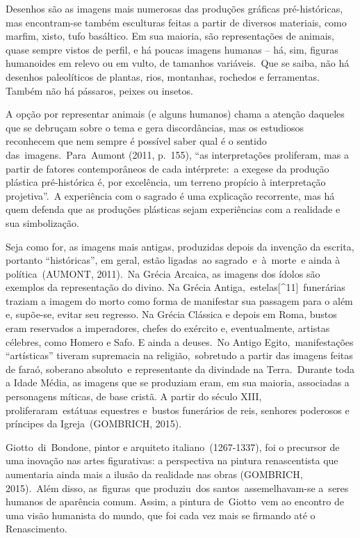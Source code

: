 \documentclass[
  letterpaper,
  a4paper,
  12pt]{scrbook}
\begin{document}
Desenhos são as imagens mais numerosas das produções gráficas
pré-históricas, mas encontram-se também esculturas feitas a partir de
diversos materiais, como marfim, xisto, tufo basáltico. Em sua maioria,
são representações de animais, quase sempre vistos de perfil, e há
poucas imagens humanas -- há, sim, figuras humanoides em relevo ou em
vulto, de tamanhos variáveis.~Que se saiba, não há desenhos paleolíticos
de plantas, rios, montanhas, rochedos e ferramentas. Também não há
pássaros, peixes ou insetos.~

A opção por representar animais (e alguns humanos) chama a atenção
daqueles que se debruçam sobre o tema e gera discordâncias, mas os
estudiosos reconhecem que nem sempre é possível saber qual é o sentido
das~imagens.~Para~Aumont (2011, p.~155), ``as interpretações proliferam,
mas a partir de fatores contemporâneos de cada intérprete:~a exegese da
produção plástica pré-histórica é, por excelência, um terreno propício à
interpretação projetiva''.~A experiência com o sagrado é uma explicação
recorrente, mas há quem defenda que as produções plásticas sejam
experiências com a realidade e sua simbolização.~

Seja como for, as imagens mais antigas, produzidas depois da invenção da
escrita, portanto ``históricas'', em geral, estão ligadas~ao
sagrado~e~à~morte~e ainda à política~(AUMONT, 2011).~Na Grécia Arcaica,
as imagens dos ídolos são exemplos da representação do divino. Na Grécia
Antiga,~estelas{[}\^{}11{]}~funerárias traziam a imagem do morto como
forma de manifestar sua passagem para o além e, supõe-se, evitar seu
regresso. Na Grécia Clássica e depois em Roma, bustos eram reservados a
imperadores, chefes do exército e, eventualmente, artistas célebres,
como Homero e Safo. E ainda a deuses.~No Antigo Egito,~manifestações
``artísticas'' tiveram supremacia na religião,~sobretudo a partir das
imagens feitas de faraó, soberano absoluto~e representante da divindade
na Terra.~Durante toda a Idade Média, as imagens que se produziam eram,
em sua maioria, associadas a personagens míticas, de base cristã. A
partir do século XIII, proliferaram~estátuas equestres e~bustos
funerários de reis, senhores poderosos e príncipes da Igreja~(GOMBRICH,
2015).

Giotto~di~Bondone, pintor e arquiteto italiano~(1267-1337), foi o
precursor de uma inovação nas artes figurativas: a perspectiva na
pintura renascentista que aumentaria ainda mais a ilusão da realidade
nas obras (GOMBRICH, 2015).~Além disso, as~figuras~que produziu~dos
santos~assemelhavam-se a~seres humanos de aparência comum. Assim, a
pintura de~Giotto~vem ao encontro de uma visão humanista do mundo, que
foi cada vez mais se firmando até o Renascimento.~
\end{document}

